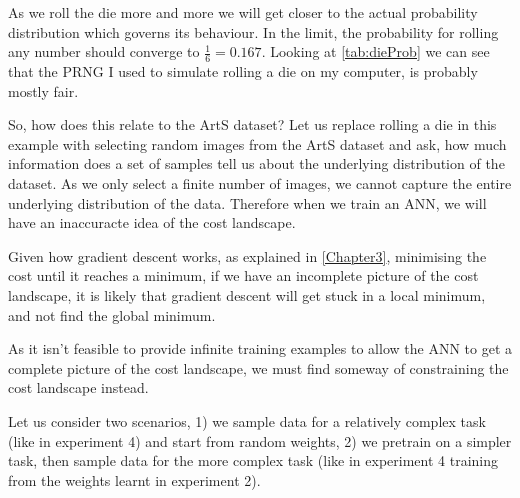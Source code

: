 As we roll the die more and more we will get closer to the actual probability distribution which governs its behaviour. In the limit, the probability for rolling any number should converge to $\frac{1}{6} = 0.167$. Looking at \autoref{tab:dieProb} we can see that the \ac{PRNG} I used to simulate rolling a die on my computer, is probably mostly fair. 

So, how does this relate to the ArtS dataset? Let us replace rolling a die in this example with selecting random images from the ArtS dataset and ask, how much information does a set of samples tell us about the underlying distribution of the dataset. As we only select a finite number of images, we cannot capture the entire underlying distribution of the data. Therefore when we train an \ac{ANN}, we will have an inaccuracte idea of the cost landscape.

Given how gradient descent works, as explained in \autoref{Chapter3},  minimising the cost until it reaches a minimum, if we have an incomplete picture of the cost landscape, it is likely that gradient descent will get stuck in a local minimum, and not find the global minimum.

As it isn't feasible to provide infinite training examples to allow the \ac{ANN} to get a complete picture of the cost landscape, we must find someway of constraining the cost landscape instead.

Let us consider two scenarios, 1) we sample data for a relatively complex task (like in experiment 4) and start from random weights, 2) we pretrain on a simpler task, then sample data for the more complex task (like in experiment 4 training from the weights learnt in experiment 2).

